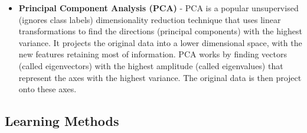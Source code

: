 \begin{itemize}
\item \textbf{Principal Component Analysis (PCA)} - PCA is a popular unsupervised (ignores class labels) dimensionality reduction technique that uses linear transformations to find the directions (principal components) with the highest variance. It projects the original data into a lower dimensional space, with the new features retaining most of information. PCA works by finding vectors (called eigenvectors) with the highest amplitude (called eigenvalues) that represent the axes with the highest variance. The original data is then project onto these axes.
\end{itemize}
\subsection{Learning Methods}

